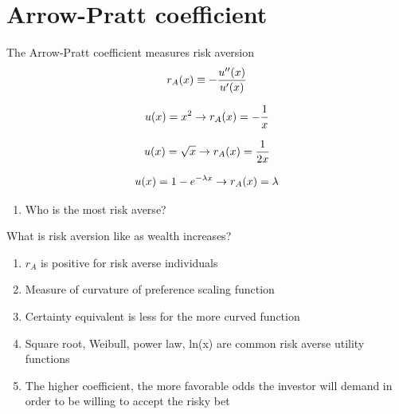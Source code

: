 \documentclass[aspectratio=1610,pdftex,dvipsnames,compress,xcolor={dvipsnames}]{beamer}
\begin{document}
\section{Arrow-Pratt coefficient}


\addtocounter{framenumber}{-1}
\begin{frame}{The Arrow-Pratt coefficient measures risk aversion}
    \begin{equation}
        \LARGE
        r_A(x) \equiv -\frac{u''(x)}{u'(x)}
    \end{equation}

    \begin{equation}
        \LARGE
        u(x)=x^2 \rightarrow r_A(x) = -\frac{1}{x}
    \end{equation}

    \begin{equation}
        \LARGE
        u(x)=\sqrt{x} \rightarrow r_A(x) = \frac{1}{2x}
    \end{equation}

    \begin{equation}
        \LARGE
        u(x)=1-e^{-\lambda x} \rightarrow r_A(x) = \lambda
    \end{equation}

    \begin{enumerate}[series=outerlist,topsep=0pt,itemsep=5pt,leftmargin=*,label=(\arabic*)]
        \item[]Who is the most risk averse?
    \end{enumerate}
\end{frame}


\begin{frame}{What is risk aversion like as wealth increases?}
    \begin{enumerate}[series=outerlist,topsep=0pt,itemsep=21pt,leftmargin=*,label=(\arabic*)]
        \item[]$r_A$ is positive for risk averse individuals
        \item[]Measure of curvature of preference scaling function
        \item[]Certainty equivalent is less for the more curved function
        \item[]Square root, Weibull, power law, ln(x) are common risk averse utility functions
        \item[]The higher coefficient, the more favorable odds the investor will demand in order to be willing to accept the risky bet
    \end{enumerate}
\end{frame}
\end{document}
